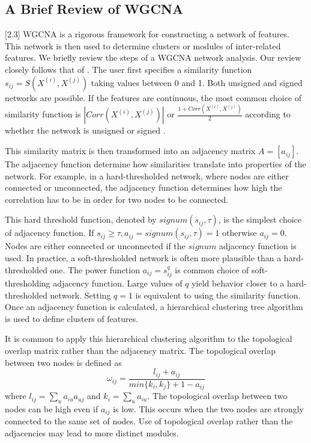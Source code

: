 \documentclass[article,shortnames]{jss}
\begin{document}
\subsection{A Brief Review of WGCNA}[2.3]
WGCNA is a rigorous framework for constructing a network of features. 
This network is then used to determine clusters or modules of inter-related features. 
We briefly review the steps of a WGCNA network analysis.  Our review closely follows that of \cite{zhang2005general}.  
The user first specifies a similarity function $s_{ij}=S(X^{(i)},X^{(j)})$ taking values between 0 and 1.  Both unsigned and signed 
networks are possible.  If the features are continuous, the most common choice of similarity function is $|Corr(X^{(i)},X^{(j)})|$ or 
$\frac{1 + Corr(X^{(i)},X^{(j)})}{2}$  according to whether the network is unsigned or signed \citep{zhang2005general}.

This similarity matrix is then transformed into an adjacency matrix $A=[a_{ij}]$.  The adjacency function determine how similarities translate
into properties of the network.  For example, in a hard-thresholded network, where nodes are either connected or unconnected,
the adjacency function determines how high the correlation has to be in order for two nodes to be connected.

This hard threshold function, denoted by $signum(s_{ij},\tau)$,  is the simplest choice of adjacency function.   
If $s_{ij} \geq \tau, a_{ij}=signum(s_{ij},\tau)=1$ otherwise $a_{ij}=0$.  Nodes are either connected or 
unconnected if the $signum$ adjacency function is used.  In practice, a soft-thresholded network is often more plausible than a 
hard-thresholded one.  The power function $a_{ij}=s_{ij}^{q}$ is common choice of soft-thresholding adjacency function.  Large values
of $q$ yield behavior closer to a hard-thresholded network.  Setting $q=1$ is equivalent to using the similarity function.
Once an adjacency function is calculated, a hierarchical clustering tree algorithm 
is used to define clusters of features.

It is common to apply this hierarchical clustering algorithm to the topological overlap matrix rather than the adjacency matrix.  The topological
overlap between two nodes is defined as 
\begin{equation}
\omega_{ij} = \frac{l_{ij} + a_{ij}}{min\{k_{i},k_{j}\} + 1 - a_{ij}}
\end{equation} 
where $l_{ij}=\sum_{u}a_{iu}a_{uj}$ and $k_{i}=\sum_{u}a_{iu}$\citep{horvath2011weighted}.  The topological overlap between two nodes can be high even if $a_{ij}$ is low.
This occurs when the two nodes are strongly connected to the same set of nodes.  Use of topological overlap rather
than the adjacencies may lead to more distinct modules\citep{zhang2005general}.
\end{document}
